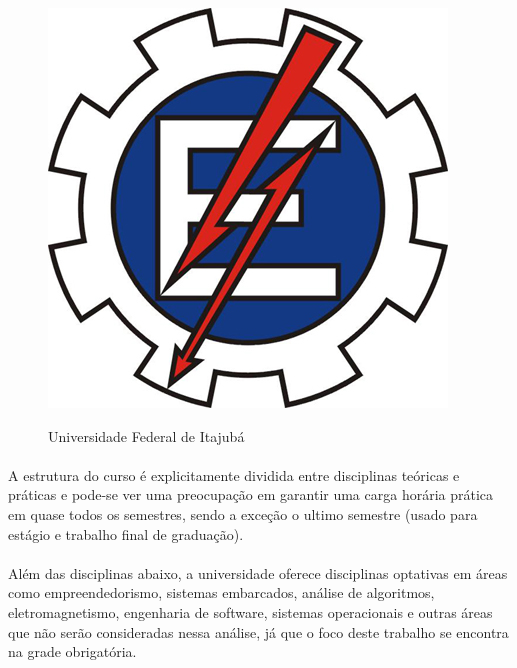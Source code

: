 \documentclass[12pt]{article} %
\begin{document}
\begin{figure}[H]
\centering
\includegraphics[scale=0.50]{pictures/fei.jpg}\\
\caption{Universidade Federal de Itajubá}

\end{figure}


\paragraph{} A estrutura do curso é explicitamente dividida entre disciplinas teóricas e práticas e pode-se ver uma preocupação em garantir uma carga horária prática em quase todos os semestres, sendo a exceção o ultimo semestre (usado para estágio e trabalho final de graduação). 

\paragraph{} Além das disciplinas abaixo, a universidade oferece disciplinas optativas em áreas como empreendedorismo, sistemas embarcados, análise de algoritmos, eletromagnetismo, engenharia de software, sistemas operacionais e outras áreas que não serão consideradas nessa análise, já que o foco deste trabalho se encontra na grade obrigatória.
\end{document}
